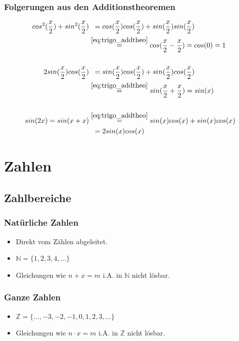 \documentclass[12pt,a4paper]{article}%
\numberwithin{equation}{section}
\newcommand{\N}{\mathbb{N}}
\newcommand{\Z}{\mathbb{Z}}
\numberwithin{equation}{subsection}
\begin{document}
	  \subsubsection{Folgerungen aus den Additionstheoremen}
	  \begin{align}
	  cos^2(\frac{x}{2}) + sin^2(\frac{x}{2}) &\;\;= cos(\frac{x}{2}) cos(\frac{x}{2}) + sin(\frac{x}{2}) sin(\frac{x}{2})\\ 
	  &\overset{\eqref{eq:trigo_addtheo}}{=} cos(\frac{x}{2}-\frac{x}{2}) = cos(0) = 1\\
	  \\
	  2sin(\frac{x}{2})cos(\frac{x}{2}) &\;\;= sin(\frac{x}{2})cos(\frac{x}{2}) + sin(\frac{x}{2})cos(\frac{x}{2})\\
	  &\overset{\eqref{eq:trigo_addtheo}}{=} sin(\frac{x}{2}+ \frac{x}{2}) = sin(x)\\
	  \\
	  sin(2x) = sin(x+x) &\overset{\eqref{eq:trigo_addtheo}}{=} sin(x)cos(x) + sin(x)cos(x) \\
	  &\;\;=2sin(x)cos(x) \label{eq:trigo:addtheo_folg}
	  \end{align}
	  \newpage

\section{Zahlen}
  \subsection{Zahlbereiche}
    \subsubsection{Natürliche Zahlen}
    \begin{itemize}
      \item Direkt vom Zählen abgeleitet.
      \item $\N = \{1, 2, 3, 4, ...\}$
      \item Gleichungen wie $n+x = m$ i.A. in $\N$ nicht lösbar. 
    \end{itemize}

    \subsubsection{Ganze Zahlen}
    \begin{itemize}
      \item $\Z = \{..., -3, -2, -1, 0, 1, 2, 3, ...\}$
      \item Gleichungen wie $n \cdot x = m$ i.A. in $\Z$ nicht lösbar.
    \end{itemize}
\end{document}
